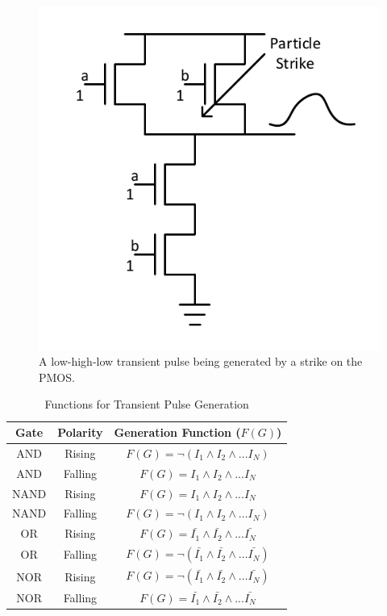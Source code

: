\begin{figure}[!htbp]
	\centering
	\includegraphics[width=0.55\linewidth]{Figures/NAND_Strike}
	\caption{A low-high-low transient pulse being generated by a strike on the PMOS.}
	\label{NANDS}
\end{figure}

\begin{table}[h]
	\begin{center}
		\caption{Functions for Transient Pulse Generation}
		\label{table:gentable}
		\begin{tabular}{|c|c|c|}
			\hline
			Gate & Polarity & Generation Function ($F(G)$) \\ 
			\hline
			AND & Rising & $F(G) =  \lnot (I_1 \land I_2 \land ... I_N)$ \\
			\hline
			AND & Falling & $F(G) = I_1 \land I_2 \land ... I_N$ \\
			\hline
			NAND & Rising & $F(G) = I_1 \land I_2 \land ... I_N$ \\
			\hline
			NAND & Falling & $F(G) = \lnot (I_1 \land I_2 \land ... I_N)$ \\
			\hline
			OR & Rising & $F(G) = \bar{I_1} \land \bar{I_2} \land ... \bar{I_N}$ \\
			\hline
			OR & Falling & $F(G) = \lnot ( \bar{I_1} \land \bar{I_2} \land ... \bar{I_N})$ \\
			\hline
			NOR & Rising & $F(G) = \lnot ( \bar{I_1} \land \bar{I_2} \land ... \bar{I_N})$ \\
			\hline
			NOR & Falling & $F(G) = \bar{I_1} \land \bar{I_2} \land ... \bar{I_N}$ \\
			\hline
		\end{tabular}
	\end{center}
\end{table}

